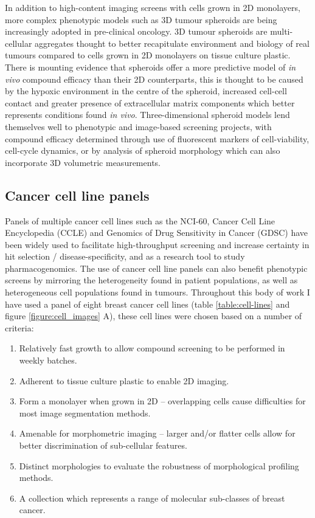 \documentclass[a4paper,11pt,twoside,openright]{scrbook}
\begin{document}
In addition to high-content imaging screens with cells grown in 2D monolayers, more complex phenotypic models such as 
3D tumour spheroids are being increasingly adopted in pre-clinical oncology.
3D tumour spheroids are multi-cellular aggregates thought to better recapitulate environment and biology of real 
tumours compared to cells grown in 2D monolayers on tissue culture plastic.
There is mounting evidence that spheroids offer a more predictive model of \textit{in vivo} compound efficacy than 
their 2D counterparts, \cite{Pickl2009, Breslin2013,Lovitt2013} this is thought to be caused by the hypoxic environment 
in the centre of the spheroid, increased cell-cell contact and greater presence of extracellular matrix components 
which better represents conditions found \textit{in vivo}.
Three-dimensional spheroid models lend themselves well to phenotypic and image-based screening projects, with compound 
efficacy determined through use of fluorescent markers of cell-viability, \cite{Lovitt2013} cell-cycle dynamics, 
\cite{Laurent2013} or by analysis of spheroid morphology which can also incorporate 3D volumetric measurements. 
\cite{Huang2017}


\subsection{Cancer cell line panels}

Panels of multiple cancer cell lines such as the NCI-60, Cancer Cell Line Encyclopedia (CCLE) \cite{Barretina2012} and 
Genomics of Drug Sensitivity in Cancer (GDSC) \cite{Yang2013} have been widely used to facilitate high-throughput 
screening and increase certainty in hit selection / disease-specificity,\cite{Wu1992,Shoemaker2006} and as a research 
tool to study pharmacogenomics. \cite{Heiser2012,Abaan2013,Jaeger2015}
The use of cancer cell line panels can also benefit phenotypic screens by mirroring the heterogeneity found in patient 
populations, as well as heterogeneous cell populations found in tumours. \cite{Caie2010}
Throughout this body of work I have used a panel of eight breast cancer cell lines (table \ref{table:cell-lines} and 
figure \ref{figure:cell_images} A), these cell lines were chosen based on a number of criteria:
\begin{enumerate}
    \item Relatively fast growth to allow compound screening to be performed in weekly batches.
    \item Adherent to tissue culture plastic to enable 2D imaging.
    \item Form a monolayer when grown in 2D -- overlapping cells cause difficulties for most image segmentation methods.
    \item Amenable for morphometric imaging -- larger and/or flatter cells allow for better discrimination of 
sub-cellular features.
    \item Distinct morphologies to evaluate the robustness of morphological profiling methods.
    \item A collection which represents a range of molecular sub-classes of breast cancer.
\end{enumerate}
\end{document}

